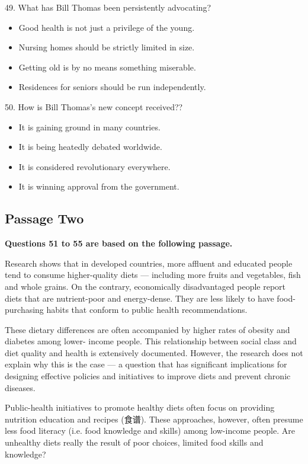 \documentclass[UTF8,11pt]{ctexart}
\begin{document}
49. What has Bill Thomas been persistently advocating?


\begin{itemize}[leftmargin=2em,itemsep=.2em,topsep=.4em]\item[A.] Good health is not just a privilege of the young.
\item[B.] Nursing homes should be strictly limited in size.
\item[C.] Getting old is by no means something miserable.
\item[D.] Residences for seniors should be run independently.
\end{itemize}

50. How is Bill Thomas's new concept received??


\begin{itemize}[leftmargin=2em,itemsep=.2em,topsep=.4em]\item[A.] It is gaining ground in many countries.
\item[B.] It is being heatedly debated worldwide.
\item[C.] It is considered revolutionary everywhere.
\item[D.] It is winning approval from the government.
\end{itemize}

\subsection*{\textbf{Passage Two}}


\textbf{Questions 51 to 55 are based on the following passage.}


Research shows that in developed countries, more affluent and educated people tend to consume higher-quality diets — including more fruits and vegetables, fish and whole grains. On the contrary, economically disadvantaged people report diets that are nutrient-poor and energy-dense. They are less likely to have food-purchasing habits that conform to public health recommendations.


These dietary differences are often accompanied by higher rates of obesity and diabetes among lower- income people. This relationship between social class and diet quality and health is extensively documented. However, the research does not explain why this is the case — a question that has significant implications for designing effective policies and initiatives to improve diets and prevent chronic diseases.


Public-health initiatives to promote healthy diets often focus on providing nutrition education and recipes (食谱). These approaches, however, often presume less food literacy (i.e. food knowledge and skills) among low-income people. Are unhealthy diets really the result of poor choices, limited food skills and knowledge?
\end{document}
